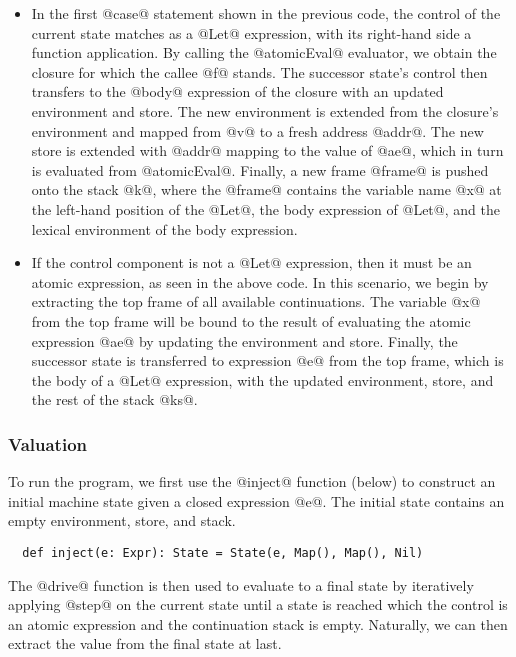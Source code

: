 \documentclass[acmsmall, review]{acmart}\settopmatter{}
\begin{document}
\begin{itemize}

\item In the first @case@ statement shown in the previous code, the control of the current 
  state matches as a @Let@ expression, with its right-hand side a function application.
  By calling the @atomicEval@ evaluator, we obtain the closure for which the callee @f@ stands.
  The successor state's control then transfers to the @body@ expression of the closure with 
  an updated environment and store. The new environment is extended from the closure's 
  environment and mapped from @v@ to a fresh address @addr@. The new store is extended with
  @addr@ mapping to the value of @ae@, which in turn is evaluated from @atomicEval@.
  Finally, a new frame @frame@ is pushed onto the stack @k@, where the @frame@ contains 
  the variable name @x@ at the left-hand position of the @Let@, the body expression of 
  @Let@, and the lexical environment of the body expression.

\item If the control component is not a @Let@ expression, then it must be an atomic
  expression, as seen in the above code. In this scenario, we begin by extracting the
  top frame of all available continuations. The variable @x@ from the top frame will
  be bound to the result of evaluating the atomic expression @ae@ by updating the
  environment and store.
  Finally, the successor state is transferred to expression @e@ from the top frame,
  which is the body of a @Let@ expression, with the updated environment, store, and
  the rest of the stack @ks@.

\end{itemize}

\subsubsection{Valuation}

To run the program, we first use the @inject@ function (below) to construct an initial 
machine state given a closed expression @e@. The initial state contains an empty environment,
store, and stack.
\begin{lstlisting}
  def inject(e: Expr): State = State(e, Map(), Map(), Nil)
\end{lstlisting}

The @drive@ function is then used to evaluate to a final state by iteratively applying 
@step@ on the current state until a state is reached which the control is an atomic 
expression and the continuation stack is empty. Naturally, we can then extract the value
from the final state at last.
\end{document}
